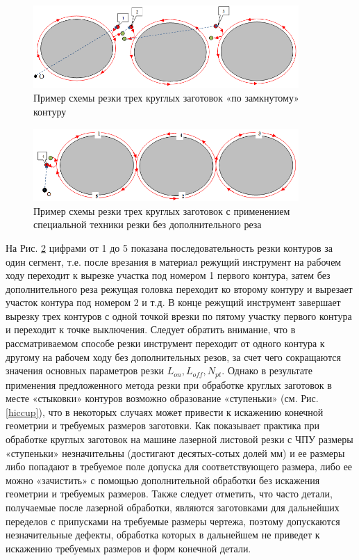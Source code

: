 \documentclass[12pt]{report}
\begin{document}
\begin{figure}
  \begin{center}
  \includegraphics[width=0.9\textwidth]{3-3.png}
  \caption{Пример схемы резки трех круглых заготовок «по замкнутому» контуру}
  \label{3-3}
  \end{center}
\end{figure}

\begin{figure}
  \begin{center}
  \includegraphics[width=0.9\textwidth]{3-1.png}
  \caption{Пример схемы резки трех круглых заготовок с применением специальной техники резки без дополнительного реза}
  \label{3-1}
  \end{center}
\end{figure}

На Рис. \ref{3-1}
цифрами от 1 до 5 показана последовательность
резки контуров за один сегмент,
т.е. после врезания в материал режущий инструмент
на рабочем ходу переходит к вырезке участка
под номером 1 первого контура,
затем без дополнительного реза режущая головка
переходит ко второму контуру и вырезает участок
контура под номером 2 и т.д.
В конце режущий инструмент завершает
вырезку трех контуров с одной точкой
врезки по пятому участку первого контура и
переходит к точке выключения.
Следует обратить внимание, что в рассматриваемом
способе резки инструмент переходит от одного контура к
другому на рабочем ходу без дополнительных резов,
за счет чего сокращаются значения основных параметров резки
$L_{on}, L_{off}, N_{pt}$.
Однако в результате применения предложенного метода
резки при обработке круглых заготовок в месте «стыковки»
контуров возможно образование «ступеньки»
(см. Рис. \ref{hiccup}),
что в некоторых случаях может привести к
искажению конечной геометрии и требуемых размеров заготовки.
Как показывает практика при обработке круглых заготовок на
машине лазерной листовой резки с ЧПУ размеры «ступеньки» незначительны
(достигают десятых-сотых долей мм)
и ее размеры либо попадают в требуемое поле допуска
для соответствующего размера, либо ее можно «зачистить»
с помощью дополнительной обработки без искажения геометрии и требуемых размеров.
Также следует отметить, что часто детали,
получаемые после лазерной обработки,
являются заготовками для дальнейших переделов с
припусками на требуемые размеры чертежа,
поэтому допускаются незначительные дефекты,
обработка которых в дальнейшем не приведет к
искажению требуемых размеров и форм конечной детали.
\end{document}
